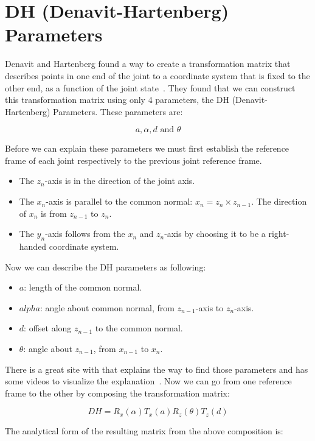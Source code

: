 \section{DH (Denavit-Hartenberg) Parameters}
Denavit and Hartenberg found a way to create a transformation matrix that describes points in one end of the joint to a coordinate system that is fixed to the other end, as a function of the joint state~\cite{dhparam1,dhparam2,introroboticscraigbook}. They found that we can construct this transformation matrix using only 4 parameters, the DH (Denavit-Hartenberg) Parameters. These parameters are: 

\[a,\alpha,d \text{ and } \theta\]

Before we can explain these parameters we must first establish the reference frame of each joint respectively to the previous joint reference frame.

\begin{itemize}
\item The \(z_n\)-axis is in the direction of the joint axis. 
\item The \(x_n\)-axis is parallel to the common normal: \(x_n = z_n \times z_{n-1}\). The direction of \(x_n\) is from \(z_{n - 1}\) to \(z_n\).
\item The \(y_n\)-axis follows from the \(x_n\)  and \(z_n\)-axis by choosing it to be a right-handed coordinate system.
\end{itemize}

Now we can describe the DH parameters as following:

\begin{itemize}
\item\(a\): length of the common normal.
\item\(alpha\): angle about common normal, from \(z_{n-1}\)-axis to \(z_n\)-axis.
\item\(d\): offset along \(z_{n-1}\) to the common normal.
\item\(\theta\): angle about \(z_{n-1}\), from \(x_{n-1}\) to \(x_n\).
\end{itemize}

There is a great site with that explains the way to find those parameters and has some videos to visualize the explanation~\cite{tekkotsu}.
Now we can go from one reference frame to the other by composing the transformation matrix:

\[DH = R_x(\alpha)T_x(a)R_z(\theta)T_z(d)\]

The analytical form of the resulting matrix from the above composition is:

